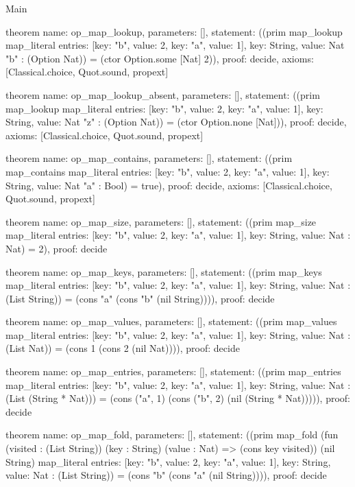 \begin{lexlean}{Main}
\begin{semanticmodule}
theorem{
  name: op_map_lookup,
  parameters: [],
  statement: ((prim map_lookup map_literal{
    entries: [{key: "b", value: 2}, {key: "a", value: 1}],
    key: String,
    value: Nat
  } "b" : (Option Nat)) = (ctor Option.some [Nat] 2)),
  proof: decide{},
  axioms: [Classical.choice, Quot.sound, propext]
}

theorem{
  name: op_map_lookup_absent,
  parameters: [],
  statement: ((prim map_lookup map_literal{
    entries: [{key: "b", value: 2}, {key: "a", value: 1}],
    key: String,
    value: Nat
  } "z" : (Option Nat)) = (ctor Option.none [Nat])),
  proof: decide{},
  axioms: [Classical.choice, Quot.sound, propext]
}

theorem{
  name: op_map_contains,
  parameters: [],
  statement: ((prim map_contains map_literal{
    entries: [{key: "b", value: 2}, {key: "a", value: 1}],
    key: String,
    value: Nat
  } "a" : Bool) = true),
  proof: decide{},
  axioms: [Classical.choice, Quot.sound, propext]
}

theorem{
  name: op_map_size,
  parameters: [],
  statement: ((prim map_size map_literal{
    entries: [{key: "b", value: 2}, {key: "a", value: 1}],
    key: String,
    value: Nat
  } : Nat) = 2),
  proof: decide{}
}

theorem{
  name: op_map_keys,
  parameters: [],
  statement: ((prim map_keys map_literal{
    entries: [{key: "b", value: 2}, {key: "a", value: 1}],
    key: String,
    value: Nat
  } : (List String)) = (cons "a" (cons "b" (nil String)))),
  proof: decide{}
}

theorem{
  name: op_map_values,
  parameters: [],
  statement: ((prim map_values map_literal{
    entries: [{key: "b", value: 2}, {key: "a", value: 1}],
    key: String,
    value: Nat
  } : (List Nat)) = (cons 1 (cons 2 (nil Nat)))),
  proof: decide{}
}

theorem{
  name: op_map_entries,
  parameters: [],
  statement: ((prim map_entries map_literal{
    entries: [{key: "b", value: 2}, {key: "a", value: 1}],
    key: String,
    value: Nat
  } : (List (String * Nat))) = (cons ("a", 1) (cons ("b", 2) (nil (String * Nat))))),
  proof: decide{}
}

theorem{
  name: op_map_fold,
  parameters: [],
  statement: ((prim map_fold (fun (visited : (List String)) (key : String) (value : Nat) => (cons key visited)) (nil String) map_literal{
    entries: [{key: "b", value: 2}, {key: "a", value: 1}],
    key: String,
    value: Nat
  } : (List String)) = (cons "b" (cons "a" (nil String)))),
  proof: decide{}
}


\end{semanticmodule}
\end{lexlean}
